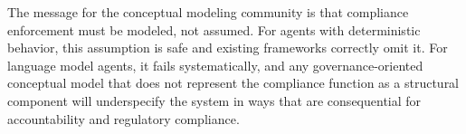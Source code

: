 \documentclass[runningheads]{llncs}
\begin{document}
The message for the conceptual modeling community is that
compliance enforcement must be modeled, not assumed. For agents with
deterministic behavior, this assumption is safe and existing frameworks
correctly omit it. For language model agents, it fails systematically,
and any governance-oriented conceptual model that does not represent the
compliance function as a structural component will underspecify the
system in ways that are consequential for accountability and regulatory
compliance.



\end{document}
